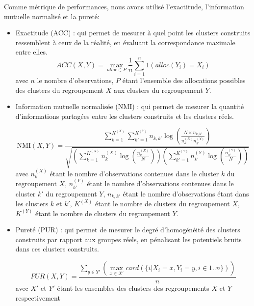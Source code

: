  	Comme métrique de performances, nous avons utilisé l'exactitude, l'information mutuelle normalisé et la pureté:
	\begin{itemize}
  	  \item Exactitude (ACC) : qui permet de mesurer à quel point les clusters construits ressemblent à ceux de la réalité, en évaluant la correspondance maximale entre elles.
  	  \begin{equation}
  		  ACC(X,Y) = \max_{alloc \in P} \frac{1}{n} \sum_{i=1}^{n} 1(alloc(Y_i) = X_i)
  	  \end{equation}
  	  avec $n$ le nombre d'observations, $P$ étant l'ensemble des allocations possibles des clusters  du regroupement $X$ aux clusters du regroupement $Y$.
      
  	  \item Information mutuelle normalisée (\acrshort{NMI}) : qui permet de mesurer la quantité d'informations partagées entre les clusters construits et les clusters réels.

  	  \begin{equation}
     	   \text{NMI}(X,Y) = \frac{ \sum_{k=1}^{K^{(X)}} \sum_{k'=1}^{K^{(Y)}} n_{k,k'} \log\left( \frac{N \times n_{k,k'}}{ n_k^{(X)} n_{k'}^{(Y)} } \right) }{  \sqrt{ \left( \sum_{k=1}^{K^{(X)}} n_k^{(X)}\log( \frac{n_k^{(X)}}{N} )  \right) \left( \sum_{k'=1}^{K^{(Y)}} n_{k'}^{(Y)} \log( \frac{n_{k'}^{(Y)}}{N} )  \right)  } }
		   	\label{equa:enss2}
  	  \end{equation}
  	  avec $n_k^{(X)}$ étant le nombre d'observations contenues dans le cluster $k$ du regroupement $X$, $n_{k'}^{(Y)}$ étant le nombre d'observations contenues dans le cluster $k'$ du regroupement $Y$, $n_{k,k'}$ étant le nombre d'observations étant dans les clusters $k$ et $k'$, $K^{(X)}$ étant le nombre de clusters du regroupement $X$, $K^{(Y)}$ étant le nombre de clusters du regroupement $Y$.
      
  	  \item Pureté (PUR) : qui permet de mesurer le degré d'homogénéité des clusters construits par rapport aux groupes réels, en pénalisant les potentiels bruits dans ces clusters construits.

  	  \begin{equation}
  		  PUR(X,Y) = \frac{ \sum_{ y \in Y'} \left( \max_{x \in X'} card(\{ i| X_i = x, Y_i = y, i \in 1..n \})\right)}{n}
  	  \end{equation}
  	  avec $X'$ et $Y'$ étant les ensembles des clusters des regroupements $X$ et $Y$ respectivement
	\end{itemize}

